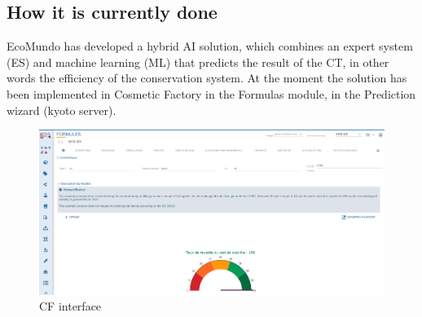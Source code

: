 \documentclass[a4paper,12pt,twoside]{report}
\begin{document}
\subsection{How it is currently done}
EcoMundo has developed a hybrid AI solution, which combines an expert system (ES) and machine learning (ML) that predicts the result of the CT, in other words the efficiency of the conservation system. 
At the moment the solution has been implemented in Cosmetic Factory in the Formulas module, in the Prediction wizard (kyoto server).
\begin{figure}[H]
		\includegraphics[width=\textwidth]{images/kyoto}
	\caption[Cosmetic Factory Interface for CT]{CF interface}
\end{figure}
\end{document}
